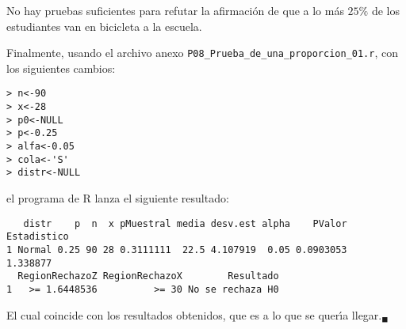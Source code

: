 \begin{solucion}
 \begin{conclusion}
  No hay pruebas suficientes para refutar la afirmaci\'on de que a lo m\'as $25\%$
  de los estudiantes van en bicicleta a la escuela.
 \end{conclusion}
 Finalmente, usando el archivo anexo \texttt{P08\_Prueba\_de\_una\_proporcion\_01.r},
 con los siguientes cambios:
 \begin{verbatim}
> n<-90
> x<-28
> p0<-NULL
> p<-0.25
> alfa<-0.05
> cola<-'S'
> distr<-NULL
 \end{verbatim}
 \vspace{-0.5cm}
 el programa de R lanza el siguiente resultado:
 \begin{verbatim}
   distr    p  n  x pMuestral media desv.est alpha    PValor Estadistico
1 Normal 0.25 90 28 0.3111111  22.5 4.107919  0.05 0.0903053    1.338877
  RegionRechazoZ RegionRechazoX        Resultado
1   >= 1.6448536          >= 30 No se rechaza H0
 \end{verbatim}
 \vspace{-0.5cm}
 El cual coincide con los resultados obtenidos,
 que es a lo que se quer\'{\i}a llegar.${}_{\blacksquare}$
\end{solucion}
